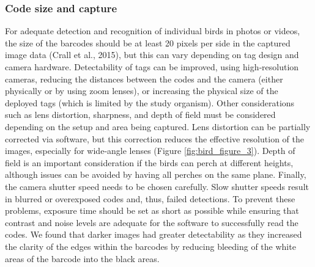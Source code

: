 \documentclass[11pt,a4paper,twoside]{book}
\begin{document}
\begin{doublespace}
\subsubsection{Code size and capture}
For adequate detection and recognition of individual birds in photos or videos, the size of the barcodes should be at least 20 pixels per side in the captured image data (Crall et al., 2015), but this can vary depending on tag design and camera hardware. Detectability of tags can be improved, using high‐resolution cameras, reducing the distances between the codes and the camera (either physically or by using zoom lenses), or increasing the physical size of the deployed tags (which is limited by the study organism). Other considerations such as lens distortion, sharpness, and depth of field must be considered depending on the setup and area being captured. Lens distortion can be partially corrected via software, but this correction reduces the effective resolution of the images, especially for wide‐angle lenses (Figure \ref{fig:bird_figure_3}). Depth of field is an important consideration if the birds can perch at different heights, although issues can be avoided by having all perches on the same plane. Finally, the camera shutter speed needs to be chosen carefully. Slow shutter speeds result in blurred or overexposed codes and, thus, failed detections. To prevent these problems, exposure time should be set as short as possible while ensuring that contrast and noise levels are adequate for the software to successfully read the codes. We found that darker images had greater detectability as they increased the clarity of the edges within the barcodes by reducing bleeding of the white areas of the barcode into the black areas.


\end{doublespace}
\end{document}
